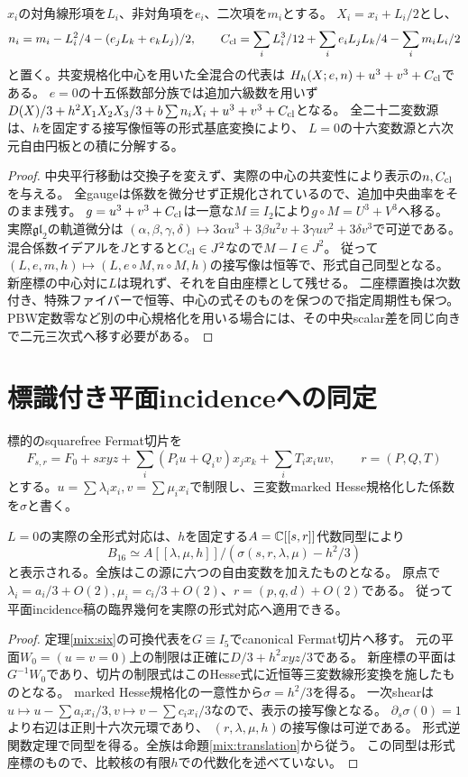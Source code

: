 \begin{proposition}[全二十一係数と六自由方向]\label{mix:translation}
$x_i$の対角線形項を$L_i$、非対角項を$e_i$、二次項を$m_i$とする。
$X_i=x_i+L_i/2$とし、
\[
 n_i=m_i-L_i^2/4-(e_jL_k+e_kL_j)/2,\qquad
 C_{\rm cl}=\sum_i L_i^3/12+\sum_i e_iL_jL_k/4-\sum_i m_iL_i/2
\]
と置く。共変規格化中心を用いた全混合の代表は
$H_h(X;e,n)+u^3+v^3+C_{\rm cl}$である。
$e=0$の十五係数部分族では追加六級数を用いず
$D(X)/3+h^2X_1X_2X_3/3+b\sum n_iX_i+u^3+v^3+C_{\rm cl}$となる。
全二十二変数源は、$h$を固定する接写像恒等の形式基底変換により、
$L=0$の十六変数源と六次元自由円板との積に分解する。
\end{proposition}
\begin{proof}
中央平行移動は交換子を変えず、実際の中心の共変性により表示の$n,C_{\rm cl}$を与える。
全gaugeは係数を微分せず正規化されているので、追加中央曲率をそのまま残す。
$g=u^3+v^3+C_{\rm cl}$は一意な$M\equiv I_2$により$g\circ M=U^3+V^3$へ移る。
実際$\mathfrak{gl}_2$の軌道微分は
$(\alpha,\beta,\gamma,\delta)\mapsto3\alpha u^3+3\beta u^2v+3\gamma uv^2+3\delta v^3$で可逆である。
混合係数イデアルを$J$とすると$C_{\rm cl}\in J^2$なので$M-I\in J^2$。
従って$(L,e,m,h)\mapsto(L,e\circ M,n\circ M,h)$の接写像は恒等で、形式自己同型となる。
新座標の中心対に$L$は現れず、それを自由座標として残せる。
二座標置換は次数付き、特殊ファイバーで恒等、中心の式そのものを保つので指定周期性も保つ。
PBW定数零など別の中心規格化を用いる場合には、その中央scalar差を同じ向きで二元三次式へ移す必要がある。
\end{proof}

\section{標識付き平面incidenceへの同定}
標的のsquarefree Fermat切片を
\[
 F_{s,r}=F_0+sxyz+\sum_i(P_iu+Q_iv)x_jx_k+\sum_iT_ix_iuv,
 \qquad r=(P,Q,T)
\]
とする。$u=\sum\lambda_ix_i,v=\sum\mu_ix_i$で制限し、三変数marked Hesse規格化した係数を$\sigma$と書く。
\begin{theorem}\label{mix:incidence}
$L=0$の実際の全形式対応は、$h$を固定する$A=\mathbb C[[s,r]]$代数同型により
\[
 B_{16}\simeq A[[\lambda,\mu,h]]/(\sigma(s,r,\lambda,\mu)-h^2/3)
\]
と表示される。全族はこの源に六つの自由変数を加えたものとなる。
原点で$\lambda_i=a_i/3+O(2),\mu_i=c_i/3+O(2)$、$r=(p,q,d)+O(2)$である。
従って平面incidence稿の臨界幾何を実際の形式対応へ適用できる。
\end{theorem}
\begin{proof}
定理\ref{mix:six}の可換代表を$G\equiv I_5$でcanonical Fermat切片へ移す。
元の平面$W_0=(u=v=0)$上の制限は正確に$D/3+h^2xyz/3$である。
新座標の平面は$G^{-1}W_0$であり、切片の制限式はこのHesse式に近恒等三変数線形変換を施したものとなる。
marked Hesse規格化の一意性から$\sigma=h^2/3$を得る。
一次shearは$u\mapsto u-\sum a_ix_i/3,v\mapsto v-\sum c_ix_i/3$なので、表示の接写像となる。
$\partial_s\sigma(0)=1$より右辺は正則十六次元環であり、
$(r,\lambda,\mu,h)$の接写像は可逆である。
形式逆関数定理で同型を得る。全族は命題\ref{mix:translation}から従う。
この同型は形式座標のもので、比較核の有限$h$での代数化を述べていない。
\end{proof}

